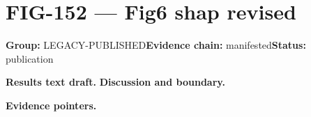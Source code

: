 \clearpage
\section{FIG-152 --- Fig6 shap revised}
\label{figpage:fig-152}
\textbf{Group:} LEGACY-PUBLISHED\quad \textbf{Evidence chain:} manifested\quad \textbf{Status:} publication

\textbf{Results text draft.} 
\textbf{Discussion and boundary.} 


\textbf{Evidence pointers.}



\vfill
